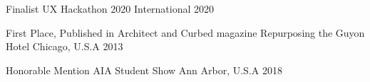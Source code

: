




\begin{cvhonors}

  \cvhonor
    {Finalist} %
    {UX Hackathon 2020} %
    {International} %
    {2020} %

  \cvhonor
    {First Place, Published in Architect and Curbed magazine } %
    {Repurposing the Guyon Hotel} %
    {Chicago, U.S.A} %
    {2013} %

  \cvhonor
    {Honorable Mention} %
    {AIA Student Show} %
    {Ann Arbor, U.S.A} %
    {2018} %


\end{cvhonors}


